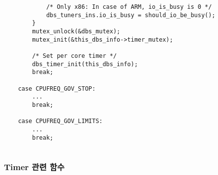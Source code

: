 \begin{lstlisting}
            /* Only x86: In case of ARM, io_is_busy is 0 */
            dbs_tuners_ins.io_is_busy = should_io_be_busy();
        }
        mutex_unlock(&dbs_mutex);
        mutex_init(&this_dbs_info->timer_mutex);

        /* Set per core timer */
        dbs_timer_init(this_dbs_info);
        break;

    case CPUFREQ_GOV_STOP:
        ...
        break;

    case CPUFREQ_GOV_LIMITS:
        ...
        break;


\end{lstlisting}


\subsubsection{Timer 관련 함수}